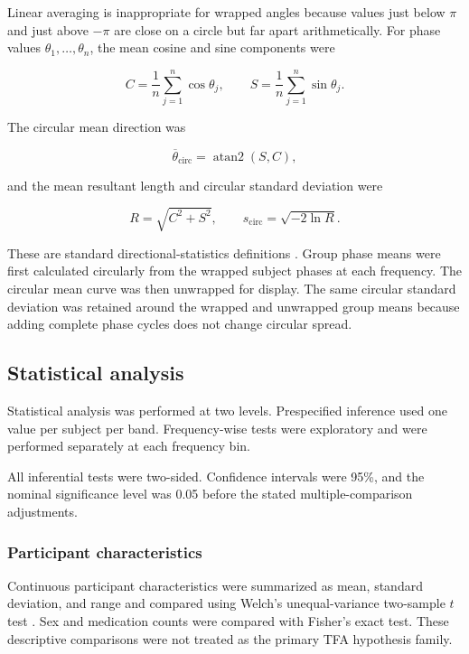 \documentclass[12pt]{article}
\newcommand{\atanTwo}{\operatorname{atan2}}
\begin{document}
Linear averaging is inappropriate for wrapped angles because values just
below $\pi$ and just above $-\pi$ are close on a circle but far apart
arithmetically. For phase values $\theta_1,\ldots,\theta_n$, the mean cosine
and sine components were

\begin{equation}
    C=\frac{1}{n}\sum_{j=1}^{n}\cos\theta_j,
    \qquad
    S=\frac{1}{n}\sum_{j=1}^{n}\sin\theta_j.
\end{equation}

The circular mean direction was

\begin{equation}
    \overline{\theta}_{\mathrm{circ}}=\atanTwo(S,C),
    \label{eq:circular_mean}
\end{equation}

and the mean resultant length and circular standard deviation were

\begin{equation}
    R=\sqrt{C^2+S^2},
    \qquad
    s_{\mathrm{circ}}=\sqrt{-2\ln R}.
    \label{eq:circular_sd}
\end{equation}

These are standard directional-statistics definitions
\cite{MardiaJupp2000,Berens2009}. Group phase means were first calculated
circularly from the wrapped subject phases at each frequency. The circular
mean curve was then unwrapped for display. The same circular standard
deviation was retained around the wrapped and unwrapped group means because
adding complete phase cycles does not change circular spread.

\subsection{Statistical analysis}

Statistical analysis was performed at two levels. Prespecified inference used
one value per subject per band. Frequency-wise tests were exploratory and were
performed separately at each frequency bin.

All inferential tests were two-sided. Confidence intervals were 95\%, and the
nominal significance level was 0.05 before the stated multiple-comparison
adjustments.

\subsubsection{Participant characteristics}

Continuous participant characteristics were summarized as mean, standard
deviation, and range and compared using Welch's unequal-variance two-sample
$t$ test \cite{Welch1947}. Sex and medication counts were compared with
Fisher's exact test. These descriptive comparisons were not treated as the
primary TFA hypothesis family.
\end{document}
